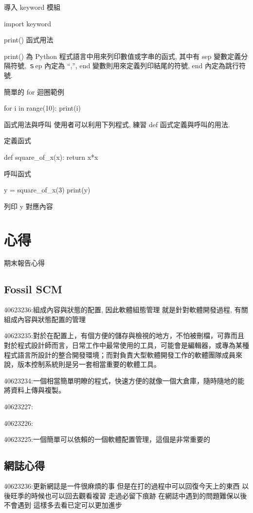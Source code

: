 \documentclass[12pt,,]{report}
\begin{document}
導入 keyword 模組

import keyword

print() 函式用法

print() 為 Python 程式語言中用來列印數值或字串的函式, 其中有 sep
變數定義分隔符號, ｓep 內定為 ``,'', end 變數則用來定義列印結尾的符號,
end 內定為跳行符號.

簡單的 for 迴圈範例

for i in range(10): print(i)

函式用法與呼叫 使用者可以利用下列程式, 練習 def 函式定義與呼叫的用法.

定義函式

def square\_of\_x(x): return x*x

呼叫函式

y = square\_of\_x(3) print(y)

列印 y 對應內容

\hypertarget{ux5fc3ux5f97}{%
\chapter{心得}\label{ux5fc3ux5f97}}

期末報告心得

\hypertarget{fossil-scm}{%
\section{Fossil SCM}\label{fossil-scm}}

40623236:組成內容與狀態的配置, 因此軟體組態管理 就是針對軟體開發過程,
有關組成內容與狀態配置的管理

40623235:對於在配置上，有個方便的儲存與檢視的地方，不怕被刪檔，可靠而且對於程式設計師而言，日常工作中最常使用的工具，可能會是編輯器，或專為某種程式語言所設計的整合開發環境；而對負責大型軟體開發工作的軟體團隊成員來說，版本控制系統則是另一套相當重要的軟體工具。

40623234:一個相當簡單明瞭的程式，快速方便的就像一個大倉庫，隨時隨地的能將資料上傳與複製。

40623227:

40623226:

40623225:一個簡單可以依賴的一個軟體配置管理，這個是非常重要的

\hypertarget{ux7db2ux8a8cux5fc3ux5f97}{%
\section{網誌心得}\label{ux7db2ux8a8cux5fc3ux5f97}}

40623236:更新網誌是一件很麻煩的事 但是在打的過程中可以回復今天上的東西
以後旺季的時候也可以回去觀看複習 走過必留下痕跡
在網誌中遇到的問題難保以後不會遇到 這樣多去看已定可以更加進步
\end{document}
